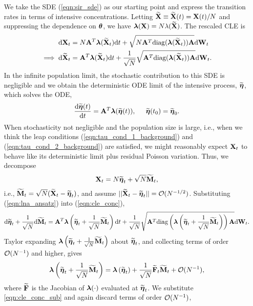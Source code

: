 We take the SDE (\ref{eqn:sir_sde}) as our starting point and express the transition rates in terms of intensive concentrations. Letting $ \widetilde{\mathbf{X}} \equiv \widetilde{\mathbf{X}}(t) = \mathbf{X}(t)/N $ and suppressing the dependence on $ \boldsymbol{\theta} $, we have $  \boldsymbol{\lambda}(\mathbf{X}) = N\lambda(\widetilde{\mathbf{X}}) $. The rescaled CLE is 
\begin{align}
\mathrm{d} \mathbf{X}_t &= N\mathbf{A}^T\boldsymbol{\lambda}(\widetilde{\mathbf{X}}_t)\mathrm{d} t + \sqrt{N\mathbf{A}^T\mathrm{diag}(\boldsymbol{\lambda}(\widetilde{\mathbf{X}}_t))\mathbf{A}}\mathrm{d}\mathbf{W}_t \nonumber\\
\label{eqn:cle_conc}
\implies \mathrm{d}\widetilde{\mathbf{X}}_t &= \mathbf{A}^T\boldsymbol{\lambda}(\widetilde{\mathbf{X}}_t)\mathrm{d} t + \frac{1}{\sqrt{N}}\sqrt{\mathbf{A}^T\mathrm{diag}(\boldsymbol{\lambda}(\widetilde{\mathbf{X}}_t))\mathbf{A}}\mathrm{d}\mathbf{W}_t.
\end{align}
In the infinite population limit, the stochastic contribution to this SDE is negligible and we obtain the deterministic ODE limit of the intensive process, $ \widetilde{\boldsymbol{\eta}} $, which solves the ODE,
\begin{equation}
\label{eqn:lna_drift}
\frac{\mathrm{d}\widetilde{\boldsymbol{\eta}}(t)}{\mathrm{d} t} = \mathbf{A}^T\boldsymbol{\lambda}(\widetilde{\boldsymbol{\eta}}(t)),\hspace{0.2in} \widetilde{\boldsymbol{\eta}}(t_0)=\widetilde{\boldsymbol{\eta}}_0.
\end{equation}
When stochasticity not negligible and the population size is large, i.e., when we think the leap conditions (\ref{eqn:tau_cond_1_background}) and (\ref{eqn:tau_cond_2_background}) are satisfied, we might reasonably expect $ \mathbf{X}_t $ to behave like its deterministic limit plus residual Poisson variation. Thus, we decompose
\begin{equation}
\label{eqn:lna_ansatz}
\mathbf{X}_t = N\widetilde{\boldsymbol{\eta}}_t + \sqrt{N}\widetilde{\mathbf{M}}_t,
\end{equation}
 i.e., $ \widetilde{\mathbf{M}}_t = \sqrt{N}(\widetilde{\mathbf{X}}_t - \widetilde{\boldsymbol{\eta}}_t) $, and assume $ ||\widetilde{\mathbf{X}}_t - \widetilde{\boldsymbol{\eta}}_t|| = \mathcal{O}(N^{-1/2}) $. Substituting (\ref{eqn:lna_ansatz}) into (\ref{eqn:cle_conc}),
 \begin{equation}
 \label{eqn:cle_conc_sub}
 \mathrm{d}\widetilde{\boldsymbol{\eta}}_t + \frac{1}{\sqrt{N}}\mathrm{d}\widetilde{\mathbf{M}}_t = \mathbf{A}^T\boldsymbol{\lambda}\left (\widetilde{\boldsymbol{\eta}}_t + \frac{1}{\sqrt{N}}\widetilde{\mathbf{M}}_t\right )\mathrm{d} t + \frac{1}{\sqrt{N}}\sqrt{\mathbf{A}^T\mathrm{diag}\left (\boldsymbol{\lambda}\left (\widetilde{\boldsymbol{\eta}}_t + \frac{1}{\sqrt{N}}\widetilde{\mathbf{M}}_t\right )\right )\mathbf{A}}\mathrm{d}\mathbf{W}_t. 
 \end{equation}
Taylor expanding $ \boldsymbol{\lambda}\left (\widetilde{\boldsymbol{\eta}}_t + \frac{1}{\sqrt{N}}\widetilde{\mathbf{M}}_t\right ) $ about $ \widetilde{\boldsymbol{\eta}}_t $, and collecting terms of order $ \mathcal{O}(N^{-1}) $ and higher, gives $$\boldsymbol{\lambda}\left (\widetilde{\boldsymbol{\eta}}_t + \frac{1}{\sqrt{N}}\widetilde{\mathbf{M}}_t\right ) = \boldsymbol{\lambda}\left (\widetilde{\boldsymbol{\eta}}_t\right ) + \frac{1}{\sqrt{N}}\widetilde{\mathbf{F}}_t\widetilde{\mathbf{M}}_t + \mathcal{O}(N^{-1}),$$
where $ \widetilde{\mathbf{F}} $ is the Jacobian of $ \boldsymbol{\lambda}(\cdot) $ evaluated at $ \widetilde{\boldsymbol{\eta}}_t $. We substitute \ref{eqn:cle_conc_sub} and again discard terms of order $ \mathcal{O}(N^{-1}) $,

